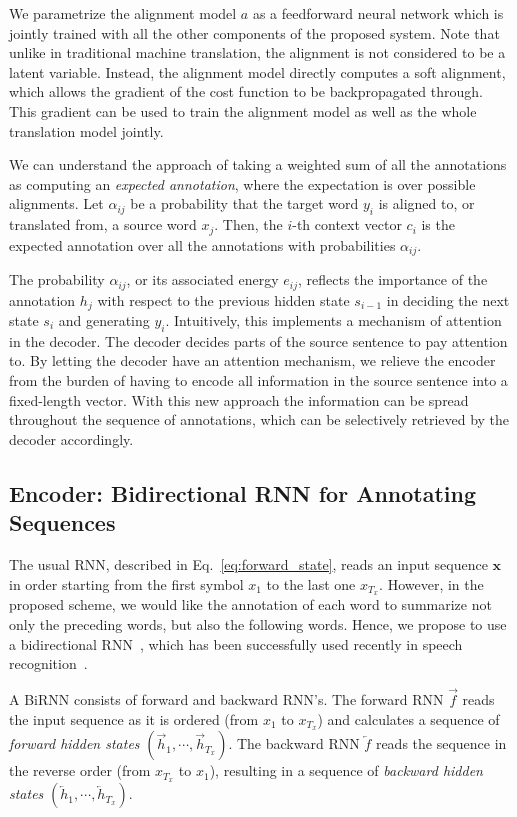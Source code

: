 \documentclass{article}
\newcommand{\vect}[1]{\mathbf{#1}}
\newcommand{\vx}[0]{\vect{x}}
\newcommand{\ola}{\overleftarrow}
\newcommand{\ora}{\overrightarrow}
\begin{document}
We parametrize the alignment model $a$ as a feedforward neural network which is
jointly trained with all the other components of the proposed system.  Note
that unlike in traditional machine translation, the alignment is not considered
to be a latent variable. Instead, the alignment model directly computes a soft
alignment, which allows the gradient of the cost function to be backpropagated
through. This gradient can be used to train the alignment model as well as the
whole translation model jointly.

We can understand the approach of taking a weighted sum of all the annotations
as computing an {\em expected annotation}, where the expectation is over
possible alignments.  Let $\alpha_{ij}$ be a probability that the target word
$y_i$ is aligned to, or translated from, a source word $x_j$. Then, the $i$-th
context vector $c_i$ is the expected annotation over all the annotations with
probabilities $\alpha_{ij}$.

The probability $\alpha_{ij}$, or its associated energy $e_{ij}$, reflects the
importance of the annotation $h_j$ with respect to the previous hidden state
$s_{i-1}$ in deciding the next state $s_i$ and generating $y_i$.  Intuitively,
this implements a mechanism of attention in the decoder. The decoder decides
parts of the source sentence to pay attention to. By letting the decoder have an
attention mechanism, we relieve the encoder from the burden of having to encode
all information in the source sentence into a fixed-length vector. With this new
approach the information can be spread throughout the sequence of annotations,
which can be selectively retrieved by the decoder accordingly.

\subsection{Encoder: Bidirectional RNN for Annotating Sequences}
\label{sec:birnn_encoder}

The usual RNN, described in Eq.~\eqref{eq:forward_state}, reads an input
sequence $\vx$ in order starting from the first symbol $x_1$ to the last one
$x_{T_x}$. However, in the proposed scheme, we would like the annotation of each
word to summarize not only the preceding words, but also the following words.
Hence, we propose to use a bidirectional RNN~\citep[BiRNN, ][]{Schuster1997},
which has been successfully used recently in speech recognition~\citep[see,
e.g.,][]{Graves2013asru}. 

A BiRNN consists of forward and backward RNN's. The forward RNN $\ora{f}$ reads
the input sequence as it is ordered (from $x_1$ to $x_{T_x}$) and calculates a
sequence of {\it forward hidden states} $( \ora{h}_1, \cdots, \ora{h}_{T_x})$.
The backward RNN $\ola{f}$ reads the sequence in the reverse order (from
$x_{T_x}$ to $x_1$), resulting in a sequence of {\it backward hidden states} $(
\ola{h}_1, \cdots, \ola{h}_{T_x})$. 
\end{document}
